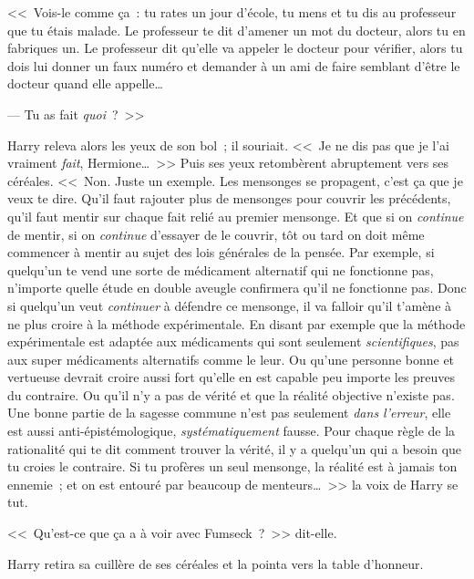<<~Vois-le comme ça~: tu rates un jour d'école, tu mens et tu dis au professeur que tu étais malade. Le professeur te dit d'amener un mot du docteur, alors tu en fabriques un. Le professeur dit qu'elle va appeler le docteur pour vérifier, alors tu dois lui donner un faux numéro et demander à un ami de faire semblant d'être le docteur quand elle appelle…

--- Tu as fait \emph{quoi}~?~>>

Harry releva alors les yeux de son bol~; il souriait. <<~Je ne dis pas que je l'ai vraiment \emph{fait}, Hermione…~>> Puis ses yeux retombèrent abruptement vers ses céréales. <<~Non. Juste un exemple. Les mensonges se propagent, c'est ça que je veux te dire. Qu'il faut rajouter plus de mensonges pour couvrir les précédents, qu'il faut mentir sur chaque fait relié au premier mensonge. Et que si on \emph{continue} de mentir, si on \emph{continue} d'essayer de le couvrir, tôt ou tard on doit même commencer à mentir au sujet des lois générales de la pensée. Par exemple, si quelqu'un te vend une sorte de médicament alternatif qui ne fonctionne pas, n'importe quelle étude en double aveugle confirmera qu'il ne fonctionne pas. Donc si quelqu'un veut \emph{continuer} à défendre ce mensonge, il va falloir qu'il t'amène à ne plus croire à la méthode expérimentale. En disant par exemple que la méthode expérimentale est adaptée aux médicaments qui sont seulement \emph{scientifiques}, pas aux super médicaments alternatifs comme le leur. Ou qu'une personne bonne et vertueuse devrait croire aussi fort qu'elle en est capable peu importe les preuves du contraire. Ou qu'il n'y a pas de vérité et que la réalité objective n'existe pas. Une bonne partie de la sagesse commune n'est pas seulement \emph{dans l'erreur}, elle est aussi anti-épistémologique, \emph{systématiquement} fausse. Pour chaque règle de la rationalité qui te dit comment trouver la vérité, il y a quelqu'un qui a besoin que tu croies le contraire. Si tu profères un seul mensonge, la réalité est à jamais ton ennemie~; et on est entouré par beaucoup de menteurs…~>> la voix de Harry se tut.

<<~Qu'est-ce que ça a à voir avec Fumseck~?~>> dit-elle.

Harry retira sa cuillère de ses céréales et la pointa vers la table d'honneur.

